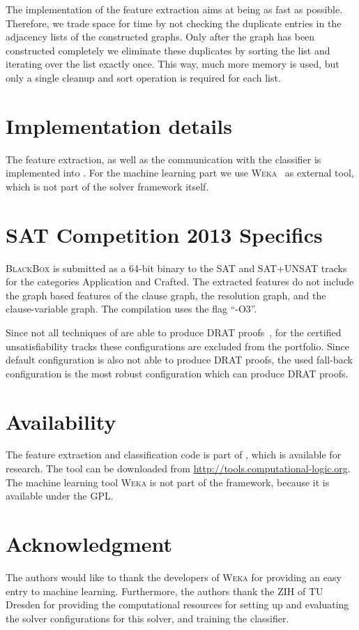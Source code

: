 \documentclass[conference]{IEEEtran}
\begin{document}
The implementation of the feature extraction aims at being as fast as possible. 
Therefore, we trade space for time by not checking the duplicate entries in the adjacency lists of the constructed graphs. 
Only after the graph has been constructed completely we eliminate these duplicates by sorting the list and iterating over the list exactly once. 
This way, much more memory is used, but only a single cleanup and sort operation is required for each list. 

\section{Implementation details}

The feature extraction, as well as the communication with the classifier is implemented into \riss. 
For the machine learning part we use \textsc{Weka}~\cite{Hall:2009:WDM:1656274.1656278} as external tool, which is not part of the solver framework itself. 
 
\section{SAT Competition 2013 Specifics}

\riss \textsc{BlackBox} is submitted as a 64-bit binary to the SAT and SAT+UNSAT tracks for the categories Application and Crafted. 
The extracted features do not include the graph based features of the clause graph, the resolution graph, and the clause-variable graph. 
The compilation uses the flag ``-O3''. 

Since not all techniques of \riss are able to produce DRAT proofs~\cite{Hall:2009:WDM:1656274.1656278}, for the certified unsatisfiability tracks these configurations are excluded from the portfolio. 
Since \riss default configuration is also not able to produce DRAT proofs, the used fall-back configuration is the most robust configuration which can produce DRAT proofs. 

\section{Availability}

The feature extraction and classification code is part of \riss, which is available for research. 
The tool can be downloaded from \url{http://tools.computational-logic.org}. 
The machine learning tool \textsc{Weka} is not part of the framework, because it is   available under the \textsc{GPL}. 

\section*{Acknowledgment}
The authors would like to thank the developers of \textsc{Weka} for providing an easy entry to machine learning. 
Furthermore, the authors thank the ZIH of TU Dresden for providing the computational resources for setting up and evaluating the solver configurations for this solver, and training the classifier. 

\newpage



\end{document}
